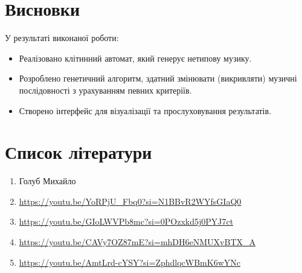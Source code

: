 \documentclass{article}
\begin{document}
    \section{Висновки}
        У результаті виконаної роботи:
        \begin{itemize}
            \item Реалізовано клітинний автомат, який генерує нетипову музику.
            \item Розроблено генетичний алгоритм, здатний змінювати (викривляти) музичні послідовності з урахуванням певних критеріїв.
            \item Створено інтерфейс для візуалізації та прослуховування результатів.
        \end{itemize}

    \section{Список літератури}
        \begin{enumerate}
            \item Голуб Михайло
            \item \url{https://youtu.be/YoRPjU_Fbq0?si=N1BBvR2WYfsGIaQ0}
            \item \url{https://youtu.be/GIoLWVPb8mc?si=0POzxkd5j0PYJ7ct}
            \item \url{https://youtu.be/CAVy7OZ87mE?si=mhDH6eNMUXvBTX_A}
            \item \url{https://youtu.be/AmtLrd-cYSY?si=ZphdlqcWBmK6wYNc}
        \end{enumerate}
\end{document}
